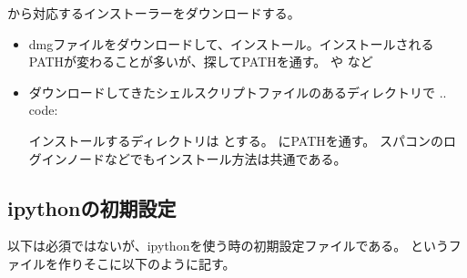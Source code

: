 \documentclass[letterpaper,10pt,dvipdfmx,report]{sphinxmanual}
\begin{document}
\sphinxAtStartPar
{} から対応するインストーラーをダウンロードする。
\begin{itemize}
\item {} \begin{description}
\sphinxAtStartPar
dmgファイルをダウンロードして、インストール。インストールされるPATHが変わることが多いが、探してPATHを通す。  や  など

\end{description}

\item {} \begin{description}
\sphinxAtStartPar
ダウンロードしてきたシェルスクリプトファイルのあるディレクトリで
.. code:

\begin{sphinxVerbatim}[commandchars=\\\{\}]
 
\end{sphinxVerbatim}

\sphinxAtStartPar
インストールするディレクトリは  とする。
 にPATHを通す。
スパコンのログインノードなどでもインストール方法は共通である。

\end{description}

\end{itemize}


\subsection{ipythonの初期設定}
\label{\detokenize{environment:ipython}}
\sphinxAtStartPar
以下は必須ではないが、ipythonを使う時の初期設定ファイルである。
というファイルを作りそこに以下のように記す。
\end{document}
